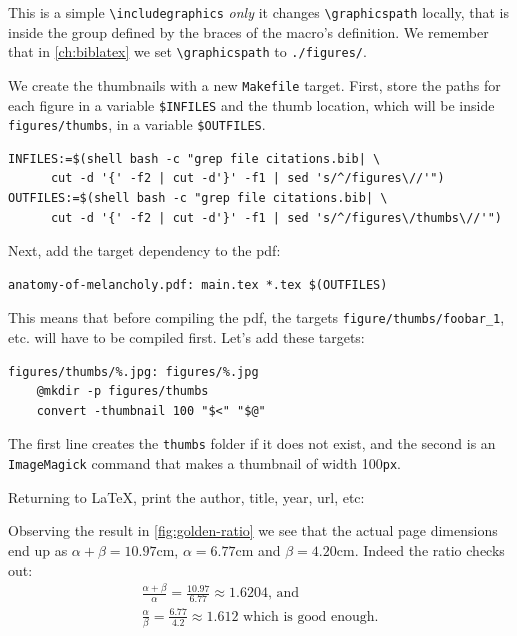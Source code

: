 \documentclass[16pt,letter,oneside,usenames,dvipsnames]{memoir}
\begin{document}
This is a simple \texttt{\textbackslash{}includegraphics} \emph{only} it changes
\texttt{\textbackslash{}graphicspath} locally, that is inside the group
defined by the braces of the macro's definition. We remember that in
\autoref{ch:biblatex} we set \texttt{\textbackslash{}graphicspath} to
\texttt{./figures/}.

We create the thumbnails with a new \texttt{Makefile} target. First,
store the paths for each figure in a variable \texttt{\$INFILES} and the
thumb location, which will be inside \texttt{figures/thumbs}, in a
variable \texttt{\$OUTFILES}.

\begin{verbatim}
INFILES:=$(shell bash -c "grep file citations.bib| \
      cut -d '{' -f2 | cut -d'}' -f1 | sed 's/^/figures\//'")
OUTFILES:=$(shell bash -c "grep file citations.bib| \
      cut -d '{' -f2 | cut -d'}' -f1 | sed 's/^/figures\/thumbs\//'")
\end{verbatim}

Next, add the target dependency to the pdf:

\begin{verbatim}
anatomy-of-melancholy.pdf: main.tex *.tex $(OUTFILES)
\end{verbatim}

This means that before compiling the pdf, the targets
\texttt{figure/thumbs/foobar\_1}, etc. will have to be compiled first.
Let's add these targets:

\begin{verbatim}
figures/thumbs/%.jpg: figures/%.jpg
    @mkdir -p figures/thumbs
    convert -thumbnail 100 "$<" "$@"
\end{verbatim}

The first line creates the \texttt{thumbs} folder if it does not exist,
and the second is an \texttt{ImageMagick} command that makes a thumbnail
of width 100\texttt{px}.

Returning to \LaTeX, print the author, title, year, url, etc:

\begin{figure}
{\centering%
%
\skelcaption[width=0.2\textwidth,lines=1]{}}
\end{figure}

Observing the result in \autoref{fig:golden-ratio} we see that the
actual page dimensions end up as $\alpha+\beta=10.97\textrm{cm}$,
$\alpha=6.77\textrm{cm}$ and $\beta=4.20\textrm{cm}$. Indeed the
ratio checks out:\\
\begin{gather*}
\frac{\alpha+\beta}{\alpha}=\frac{10.97}{6.77}\approx{}1.6204\text{, and}\\
\frac{\alpha}{\beta}=\frac{6.77}{4.2}\approx{}1.612\text{ which is good enough.}
\end{gather*}
\end{document}
